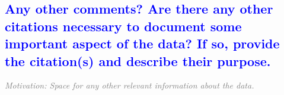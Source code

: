 \documentclass[letterpaper, 10 pt, transmag]{IEEEtran}
\begin{document}
\textcolor{blue}{\subsection{Any other comments? Are there any other citations necessary to document some important aspect of the data? If so, provide the citation(s) and describe their purpose.}}
\textcolor{gray}{\textit{Motivation: Space for any other relevant information about the data.}}


\bigskip
 
  

\end{document}

